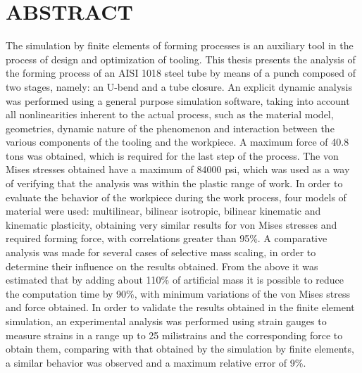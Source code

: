 \chapter*{ABSTRACT}

The simulation by finite elements of forming processes is an auxiliary tool in the process of design and optimization of tooling. This thesis presents the analysis of the forming process of an AISI 1018 steel tube by means of a punch composed of two stages, namely: an U-bend and a tube closure. An explicit dynamic analysis was performed using a 
general purpose simulation software, taking into account all nonlinearities inherent to the actual process, such as the material model, geometries, dynamic nature of the phenomenon and interaction between the various components of the tooling and the workpiece. A maximum force of 40.8 tons was obtained, which is required for the last step of the process. The von Mises stresses obtained have a maximum of 84000 psi, which was used as a way of verifying that the analysis was within the plastic range of work. In order to evaluate the behavior of the workpiece during the work process, four models of material were used: multilinear, bilinear isotropic, bilinear kinematic and kinematic plasticity, obtaining very similar results for von Mises stresses and required forming force, with correlations greater than 95\%. A comparative analysis was made for several cases of selective mass scaling, in order to determine their influence on the results obtained. From the above it was estimated that by adding about 110\% of artificial mass it is possible to reduce the computation time by 90\%, with minimum variations of the von Mises stress and force obtained. In order to validate the results obtained in the finite element simulation, an experimental analysis was performed using strain gauges to measure strains in a range up to 25 milistrains and the corresponding force to obtain them, comparing with that obtained by the simulation by finite elements, a similar behavior was observed and a maximum relative error of 9\%.